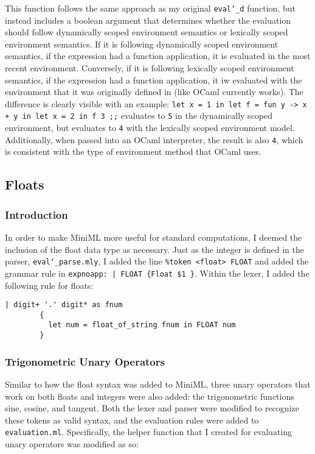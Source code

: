 \documentclass{article}
\begin{document}
This function follows the same approach as my original \texttt{eval\char`_d} function, but instead includes a boolean argument that determines whether the evaluation should follow dynamically scoped environment semantics or lexically scoped environment semantics. If it is following dynamically scoped environment semantics, if the expression had a function application, it is evaluated in the most recent environment. Conversely, if it is following lexically scoped environment semantics, if the expression had a function application, it iw evaluated with the environment that it was originally defined in (like OCaml currently works). The difference is clearly visible with an example: \texttt{let x = 1 in let f = fun y -> x + y in let x = 2 in f 3 ;;} evaluates to \texttt{5} in the dynamically scoped environment, but evaluates to \texttt{4} with the lexically scoped environment model. Additionally, when passed into an OCaml interpreter, the result is also \texttt{4}, which is consistent with the type of environment method that OCaml uses. 

\subsection{Floats}

\subsubsection{Introduction}

In order to make MiniML more useful for standard computations, I deemed the inclusion of the float data type as necessary. Just as the integer is defined in the parser, \texttt{eval\char`_parse.mly}, I added the line \texttt{\%token <float> FLOAT} and added the grammar rule in \texttt{expnoapp: | FLOAT         \{Float \$1 \}}. Within the lexer, I added the following rule for floats: 

\begin{verbatim}
| digit+ '.' digit* as fnum
        {
          let num = float_of_string fnum in FLOAT num
        }
\end{verbatim}

\subsubsection{Trigonometric Unary Operators}

Similar to how the float syntax was added to MiniML, three unary operators that work on both floats and integers were also added: the trigonometric functions sine, cosine, and tangent. Both the lexer and parser were modified to recognize these tokens as valid syntax, and the evaluation rules were added to \texttt{evaluation.ml}. Specifically, the helper function that I created for evaluating unary operators was modified as so:
\end{document}
